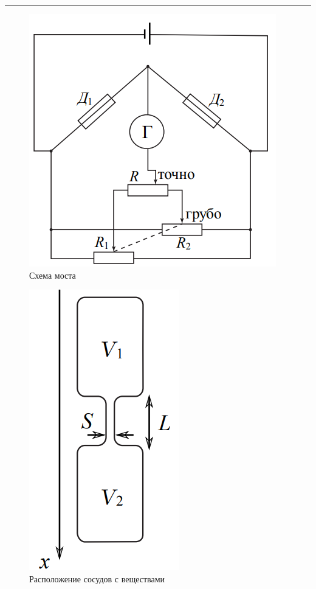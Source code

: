 \documentclass[a4paper,12pt]{report}
\begin{document}
    \hrule
    \begin{multicols}{2}
    \begin{figure}[H]
        \includegraphics[width=0.64\columnwidth]{../img/schematic.png}
        \centering
        \caption{Схема моста}
        \label{fig:1}
    \end{figure}
    \newcolumn
    \begin{figure}[H]
        \includegraphics[width=0.35\linewidth]{../img/volumes.png}
        \centering
        \caption{Расположение сосудов с веществами}
        \label{fig:2}
    \end{figure}
    \end{multicols}

    \newpage
\end{document}
